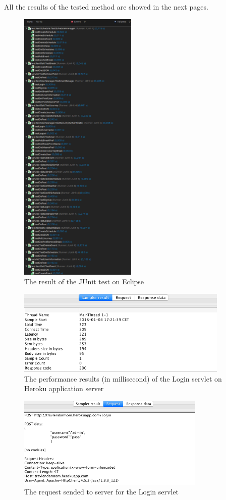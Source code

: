 \documentclass[numbers=noenddot, 12pt, a4paper, oneside]{scrbook}
\begin{document}
All the results of the tested method are showed in the next pages.
\begin{figure}[H]
	\centering
	\includegraphics[width=0.5\textwidth]{Test/ServerEclipse}
	\caption{The result of the JUnit test on Eclipse}
\end{figure}

\begin{figure}[H]
	\centering
	\includegraphics[width=0.9\textwidth]{Test/LoginMain}
	\caption{The performance results (in millisecond) of the Login servlet on Heroku application server}
\end{figure}

\begin{figure}[H]
\centering
\includegraphics[width=0.8\textwidth]{Test/LoginReq}
\caption{The request sended to server for the Login servlet}
\end{figure}
\end{document}
